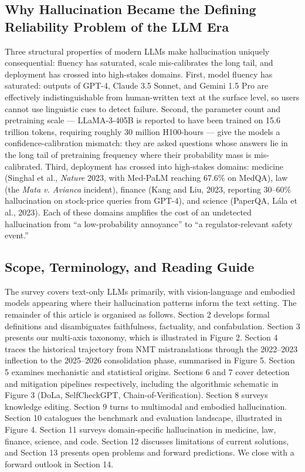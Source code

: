 \subsection{Why Hallucination Became the Defining Reliability Problem of the LLM Era}\label{why-hallucination-became-the-defining-reliability-problem-of-the-llm-era}

Three structural properties of modern LLMs make hallucination uniquely consequential: fluency has saturated, scale mis-calibrates the long tail, and deployment has crossed into high-stakes domains. First, model fluency has saturated: outputs of GPT-4, Claude 3.5 Sonnet, and Gemini 1.5 Pro are effectively indistinguishable from human-written text at the surface level, so users cannot use linguistic cues to detect failure. Second, the parameter count and pretraining scale --- LLaMA-3-405B is reported to have been trained on 15.6 trillion tokens, requiring roughly 30 million H100-hours --- give the models a confidence-calibration mismatch: they are asked questions whose answers lie in the long tail of pretraining frequency where their probability mass is mis-calibrated. Third, deployment has crossed into high-stakes domains: medicine (Singhal et al., \emph{Nature} 2023, with Med-PaLM reaching 67.6\% on MedQA), law (the \emph{Mata v. Avianca} incident), finance (Kang and Liu, 2023, reporting 30--60\% hallucination on stock-price queries from GPT-4), and science (PaperQA, Lála et al., 2023). Each of these domains amplifies the cost of an undetected hallucination from ``a low-probability annoyance'' to ``a regulator-relevant safety event.''

\subsection{Scope, Terminology, and Reading Guide}\label{scope-terminology-and-reading-guide}

The survey covers text-only LLMs primarily, with vision-language and embodied models appearing where their hallucination patterns inform the text setting. The remainder of this article is organised as follows. Section 2 develops formal definitions and disambiguates faithfulness, factuality, and confabulation. Section 3 presents our multi-axis taxonomy, which is illustrated in Figure 2. Section 4 traces the historical trajectory from NMT mistranslations through the 2022--2023 inflection to the 2025--2026 consolidation phase, summarised in Figure 5. Section 5 examines mechanistic and statistical origins. Sections 6 and 7 cover detection and mitigation pipelines respectively, including the algorithmic schematic in Figure 3 (DoLa, SelfCheckGPT, Chain-of-Verification). Section 8 surveys knowledge editing. Section 9 turns to multimodal and embodied hallucination. Section 10 catalogues the benchmark and evaluation landscape, illustrated in Figure 4. Section 11 surveys domain-specific hallucination in medicine, law, finance, science, and code. Section 12 discusses limitations of current solutions, and Section 13 presents open problems and forward predictions. We close with a forward outlook in Section 14.

